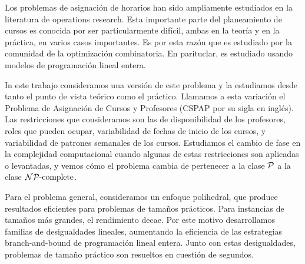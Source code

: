 Los problemas de asignación de horarios han sido ampliamente estudiados en la literatura de operations research. Esta importante parte del planeamiento de cursos es conocida por ser particularmente difícil, ambas en la teoría y en la práctica, en varios casos importantes. Es por esta razón que es estudiado por la comunidad de la optimización combinatoria. En parituclar, es estudiado usando modelos de programación lineal entera.

In este trabajo consideramos una versión de este problema y la estudiamos desde tanto el punto de vista teórico como el práctico. Llamamos a esta variación el Problema de Asignación de Cursos y Profesores (CSPAP por su sigla en inglés). Las restricciones que consideramos son las de disponibilidad de los profesores, roles que pueden ocupar, variabilidad de fechas de inicio de los cursos, y variabilidad de patrones semanales de los cursos. Estudiamos el cambio de fase en la complejidad computacional cuando algunas de estas restricciones son aplicadas o levantadas, y vemos cómo el problema cambia de pertenecer a la clase $\mathcal{P}$ a la clase $\mathcal{NP}{\text{-complete}}$.

Para el problema general, consideramos un enfoque polihedral, que produce resultados eficientes para problemas de tamaños prácticos. Para instancias de tamaños más grandes, el rendimiento decae. Por este motivo desarrollamos familias de desigualdades lineales, aumentando la eficiencia de las estrategias branch-and-bound de programación lineal entera. Junto con estas desigualdades, problemas de tamaño práctico son resueltos en cuestión de segundos.
